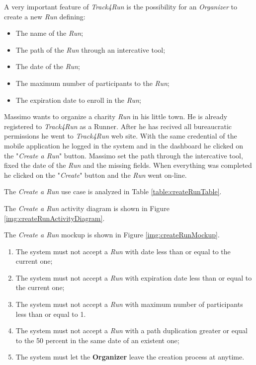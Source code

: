 A very important feature of \textit{Track4Run} is the possibility for an \textit{Organizer} to create a new \textit{Run} defining:
\begin{itemize}
  \item The name of the \textit{Run};
  \item The path of the \textit{Run} through an intercative tool;
  \item The date of the \textit{Run};
  \item The maximum number of participants to the \textit{Run};
  \item The expiration date to enroll in the \textit{Run};
\end{itemize}

Massimo wants to organize a charity \textit{Run} in his little town. He is already registered to \textit{Track4Run} as a Runner. After he has recived all bureaucratic permissions he went to \textit{Track4Run} web site.
With the same credential of the mobile application he logged in the system and in the dashboard he clicked on the "\textit{Create a Run}" button. Massimo set the path through the intercative tool, fixed the date of the \textit{Run} and the missing fields. When everything was completed he clicked on the "\textit{Create}" button and the \textit{Run} went on-line.

The \textit{Create a Run} use case is analyzed in Table \ref{table:createRunTable}.

The \textit{Create a Run} activity diagram is shown in Figure \ref{img:createRunActivityDiagram}.

The \textit{Create a Run} mockup is shown in Figure \ref{img:createRunMockup}.

\begin{enumerate}
  \item The system must not accept a \textit{Run} with date less than or equal to the current one;
  \item The system must not accept a \textit{Run} with expiration date less than or equal to the current one;
  \item The system must not accept a \textit{Run} with maximum number of participants less than or equal to 1.
  \item The system must not accept a \textit{Run} with a path duplication greater or equal to the 50 percent in the same date of an existent one;
  \item The system must let the \textbf{Organizer} leave the creation process at anytime.
\end{enumerate}

